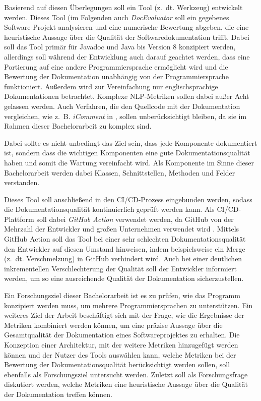 \hfill

Basierend auf diesen Überlegungen soll ein Tool (z.~dt. Werkzeug) entwickelt werden. Dieses Tool (im Folgenden auch \textit{DocEvaluator} soll ein gegebenes Software-Projekt analysieren und eine numerische Bewertung abgeben, die eine heuristische Aussage über die Qualität der Softwaredokumentation trifft.  Dabei soll das Tool primär für Javadoc und Java bis Version 8 konzipiert werden, allerdings soll während der Entwicklung auch darauf geachtet werden, dass eine Portierung auf eine andere Programmiersprache ermöglicht wird und die Bewertung der Dokumentation unabhängig von der Programmiersprache funktioniert. Außerdem wird zur Vereinfachung nur englischsprachige Dokumentationen betrachtet. Komplexe \ac{NLP}-Metriken sollen dabei außer Acht gelassen werden. Auch Verfahren, die  den  Quellcode mit der Dokumentation vergleichen, wie z.~B. \textit{iComment} in \cite[S.~145ff.]{icomment}, sollen unberücksichtigt bleiben, da sie im Rahmen dieser Bachelorarbeit zu komplex sind. 

Dabei sollte es nicht unbedingt das Ziel sein, dass jede Komponente dokumentiert ist, sondern dass die wichtigen Komponenten eine gute Dokumentationsqualität haben und somit die Wartung vereinfacht wird. Als Komponente im Sinne dieser Bachelorarbeit werden dabei Klassen, Schnittstellen, Methoden und Felder verstanden. 

Dieses Tool soll anschließend in den \ac{CI/CD}-Prozess eingebunden werden, sodass die Dokumentationsqualität kontinuierlich geprüft werden kann. Als \ac{CI/CD}-Plattform soll dabei \textit{GitHub Action} \cite{GithubActions} verwendet werden, da GitHub von der Mehrzahl der Entwickler und großen Unternehmen verwendet wird \cite{github_popular}. Mittels GitHub Action soll das Tool bei einer sehr schlechten Dokumentationsqualität den Entwickler auf diesen Umstand hinweisen, indem beispielsweise ein Merge (z.~dt. Verschmelzung) in GitHub verhindert wird. Auch bei einer deutlichen inkrementellen Verschlechterung der Qualität soll der Entwickler informiert werden, um so eine ausreichende Qualität der Dokumentation sicherzustellen. 

Ein Forschungsziel dieser Bachelorarbeit ist es zu prüfen, wie das Programm konzipiert werden muss, um mehrere Programmiersprachen zu unterstützen. Ein weiteres Ziel der Arbeit beschäftigt sich mit der Frage, wie die Ergebnisse der Metriken kombiniert werden können, um eine präzise Aussage über die Gesamtqualität der Dokumentation eines Softwareprojektes zu erhalten. Die Konzeption einer Architektur, mit der weitere Metriken hinzugefügt werden können und der Nutzer des Tools auswählen kann, welche Metriken bei der Bewertung der Dokumentationsqualität berücksichtigt werden sollen, soll ebenfalls als Forschungsziel untersucht werden. Zuletzt soll als Forschungsfrage diskutiert werden, welche Metriken eine heuristische Aussage über die Qualität der Dokumentation treffen können. 


